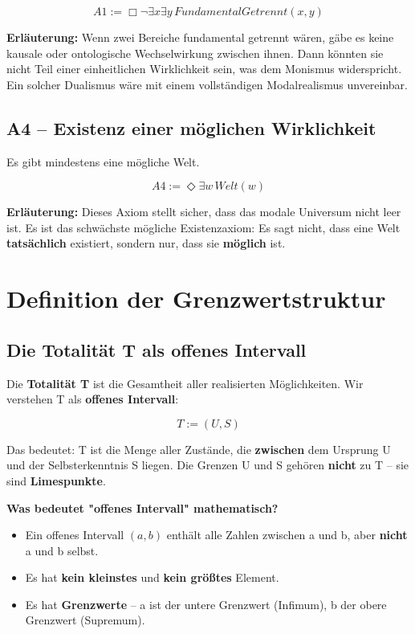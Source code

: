 \documentclass[
]{article}
\begin{document}
\[
\boxed{A1 := \Box\neg\exists x\exists y\, FundamentalGetrennt(x,y)}
\]

\textbf{Erläuterung:} Wenn zwei Bereiche fundamental getrennt wären, gäbe es keine kausale oder ontologische Wechselwirkung zwischen ihnen. Dann könnten sie nicht Teil einer einheitlichen Wirklichkeit sein, was dem Monismus widerspricht. Ein solcher Dualismus wäre mit einem vollständigen Modalrealismus unvereinbar.

\subsection{A4 – Existenz einer möglichen Wirklichkeit}\label{a4-existenz-einer-moumlglichen-wirklichkeit}

Es gibt mindestens eine mögliche Welt.

\[
\boxed{A4 := \Diamond\exists w\, Welt(w)}
\]

\textbf{Erläuterung:} Dieses Axiom stellt sicher, dass das modale Universum nicht leer ist. Es ist das schwächste mögliche Existenzaxiom: Es sagt nicht, dass eine Welt \textbf{tatsächlich} existiert, sondern nur, dass sie \textbf{möglich} ist.

\section{Definition der Grenzwertstruktur}\label{definition-der-grenzwertstruktur}

\subsection{Die Totalität T als offenes Intervall}\label{die-totalituxe4t-t-als-offenes-intervall}

Die \textbf{Totalität T} ist die Gesamtheit aller realisierten Möglichkeiten. Wir verstehen T als \textbf{offenes Intervall}:

\[
\boxed{T := (U, S)}
\]

Das bedeutet: T ist die Menge aller Zustände, die \textbf{zwischen} dem Ursprung U und der Selbsterkenntnis S liegen. Die Grenzen U und S gehören \textbf{nicht} zu T – sie sind \textbf{Limespunkte}.

\textbf{Was bedeutet "offenes Intervall" mathematisch?}
\begin{itemize}
\item Ein offenes Intervall \((a, b)\) enthält alle Zahlen zwischen a und b, aber \textbf{nicht} a und b selbst.
\item Es hat \textbf{kein kleinstes} und \textbf{kein größtes} Element.
\item Es hat \textbf{Grenzwerte} – a ist der untere Grenzwert (Infimum), b der obere Grenzwert (Supremum).
\end{itemize}
\end{document}
